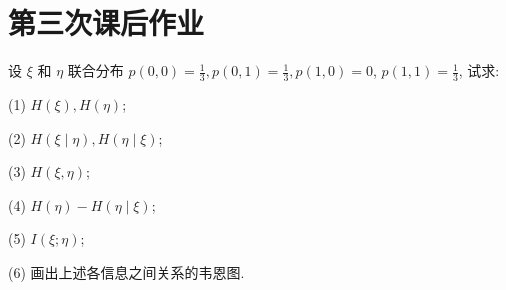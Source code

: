 \section{第三次课后作业}

\begin{tcolorbox}[breakable,colback=blue!5!white,colframe=blue!75!black,
 title= 2024-03-11]
 设 $ \xi $ 和 $ \eta $ 联合分布 $ p(0,0)=\frac{1}{3}, p(0,1)=\frac{1}{3}, p(1,0)=0 $, $ p(1,1)=\frac{1}{3} $, 试求:
 
(1) $ H(\xi), H(\eta) $;

(2) $ H(\xi \mid \eta), H(\eta \mid \xi) $;

(3) $ H(\xi, \eta) $;

(4) $ H(\eta)-H(\eta \mid \xi) $;

(5) $ I(\xi ; \eta) $;

(6) 画出上述各信息之间关系的韦恩图.


\end{tcolorbox}
